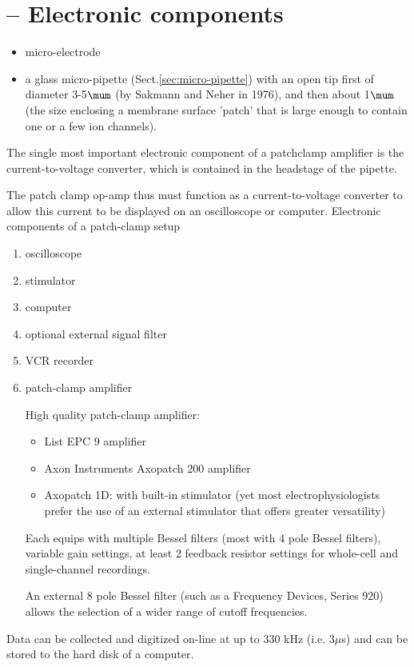 \section{-- Electronic components}
\label{sec:patch-clamp-electronic-component}

\begin{itemize}
  \item micro-electrode

  \item a glass micro-pipette (Sect.\ref{sec:micro-pipette}) with an open tip
  first of diameter 3-5$\mum$ (by Sakmann and Neher in 1976), and then
  about 1$\mum$ (the size enclosing a membrane surface 'patch' that is large
  enough to contain one or a few ion channels).
\end{itemize}

\label{sec:current-to-voltage-converter}
The single most important electronic component of a patchclamp
amplifier is the current-to-voltage converter, which is contained
in the headstage of the pipette.

The  patch clamp op-amp thus must function as a current-to-voltage converter to
allow this current to be displayed on an oscilloscope or computer.
Electronic components of a patch-clamp setup
\begin{enumerate}
  \item oscilloscope
  \item stimulator
  \item computer
  \item optional external signal filter
  \item VCR recorder
  \item patch-clamp amplifier

High quality patch-clamp amplifier:
\begin{itemize}
  \item List EPC 9 amplifier
  \item Axon Instruments Axopatch 200 amplifier
  \item Axopatch 1D: with built-in stimulator (yet most electrophysiologists
  prefer the use of an external stimulator that offers greater versatility)
\end{itemize}
Each equips with multiple Bessel filters (most with 4 pole Bessel filters),
variable gain settings, at least 2 feedback resistor settings for whole-cell and
single-channel recordings.

An external 8 pole Bessel filter (such as a Frequency Devices, Series 920)
allows the selection of a wider range of cutoff frequencies.
\end{enumerate}
Data can be collected and digitized on-line at up to 330 kHz (i.e. 3$\mu$s) and
can be stored to the hard disk of a computer.

